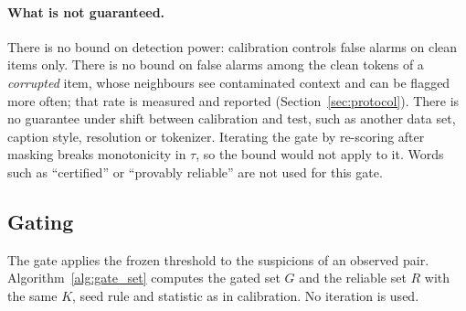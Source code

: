 \paragraph{What is not guaranteed.}
There is no bound on detection power: calibration controls false alarms on clean items only.
There is no bound on false alarms among the clean tokens of a \emph{corrupted} item, whose neighbours see contaminated context
and can be flagged more often; that rate is measured and reported (Section~\ref{sec:protocol}).
There is no guarantee under shift between calibration and test, such as another data set, caption style, resolution or
tokenizer.
Iterating the gate by re-scoring after masking breaks monotonicity in $\tau$, so the bound would not apply to it.
Words such as ``certified'' or ``provably reliable'' are not used for this gate.

\begin{algorithm}[t]
\caption{\textsc{CalibrateThreshold}}\label{alg:calibrate}
\end{algorithm}

\subsection{Gating}\label{ssec:gate}
The gate applies the frozen threshold to the suspicions of an observed pair.
Algorithm~\ref{alg:gate_set} computes the gated set $G$ and the reliable set $R$ with the same $K$, seed rule and statistic as
in calibration.
No iteration is used.

\begin{algorithm}[t]
\caption{\textsc{Gate} (uses Algorithms~\ref{alg:reliability} and~\ref{alg:calibrate})}\label{alg:gate_set}
\end{algorithm}

